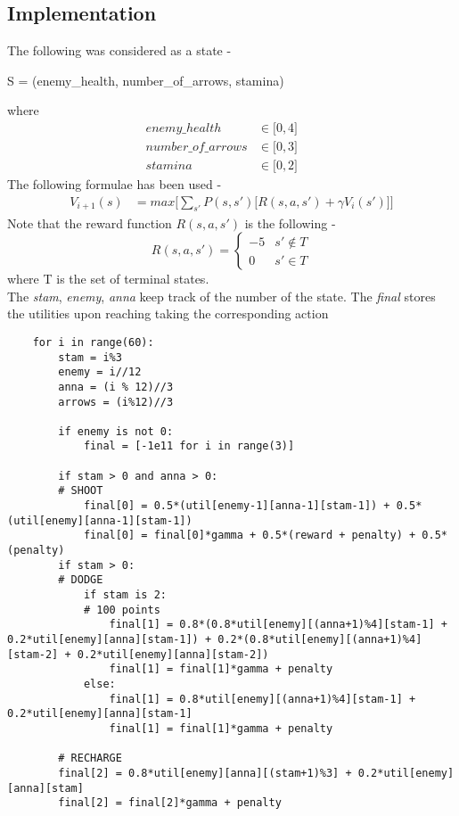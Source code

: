 \documentclass[11pt]{article}
\begin{document}
	\subsection{Implementation}
	The following was considered as a state - 
	\begin{center}
		S = (enemy\_health, number\_of\_arrows, stamina)
	\end{center}
	where 	
	\begin{align*}
		enemy\_health &\in \big[0,4\big] &  &   \\
		number\_of\_arrows & \in \big[0,3\big] & &  \\
		stamina &\in \big[0,2\big] &   &  
	\end{align*}
	The following formulae has been used - 
	\begin{align*}
	V_{i+1}(s) &= max \bigg[\sum_{s'}^{}P(s,s')\big[R(s,a,s') + \gamma V_{i}(s')\big]\bigg]
	\end{align*}
		Note that the reward function $R(s,a,s')$ is the following - 
	\begin{equation*}
	R(s,a,s') = \begin{cases}
	-5 & s' \notin T \\
	0 & s' \in T
	\end{cases}
	\end{equation*}
	where T is the set of terminal states.\\
	The \emph{stam}, \emph{enemy}, \emph{anna} keep track of the number of the state. The \emph{final} stores the utilities upon reaching taking the corresponding action
	\begin{lstlisting}
	for i in range(60):
		stam = i%3
		enemy = i//12
		anna = (i % 12)//3
		arrows = (i%12)//3
		
		if enemy is not 0:    
			final = [-1e11 for i in range(3)]
	
		if stam > 0 and anna > 0: 
		# SHOOT
			final[0] = 0.5*(util[enemy-1][anna-1][stam-1]) + 0.5*(util[enemy][anna-1][stam-1])
			final[0] = final[0]*gamma + 0.5*(reward + penalty) + 0.5*(penalty)
		if stam > 0:
		# DODGE
			if stam is 2:
			# 100 points
				final[1] = 0.8*(0.8*util[enemy][(anna+1)%4][stam-1] + 0.2*util[enemy][anna][stam-1]) + 0.2*(0.8*util[enemy][(anna+1)%4][stam-2] + 0.2*util[enemy][anna][stam-2])
				final[1] = final[1]*gamma + penalty
			else:
				final[1] = 0.8*util[enemy][(anna+1)%4][stam-1] + 0.2*util[enemy][anna][stam-1]
				final[1] = final[1]*gamma + penalty
	
		# RECHARGE
		final[2] = 0.8*util[enemy][anna][(stam+1)%3] + 0.2*util[enemy][anna][stam]
		final[2] = final[2]*gamma + penalty
		
	\end{lstlisting}
\end{document}
